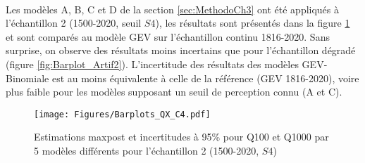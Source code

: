 \documentclass[11pt]{article}
\begin{document}
	\paragraph{} Les modèles A, B, C et D de la section \ref{sec:MethodoCh3} ont été appliqués à l'échantillon 2 (1500-2020, seuil $S4$), les résultats sont présentés dans la figure \ref{fig:BarplotC4} et sont comparés au modèle GEV sur l'échantillon continu 1816-2020. Sans surprise, on observe des résultats moins incertains que pour l'échantillon dégradé (figure \ref{fig:Barplot_Artif2}). L'incertitude des résultats des modèles GEV-Binomiale est au moins équivalente à celle de la référence (GEV 1816-2020), voire plus faible pour les modèles supposant un seuil de perception connu (A et C).

	\begin{figure}[h]
		\centering
		\texttt{[image: Figures/Barplots\_QX\_C4.pdf]}
		\caption{Estimations maxpost et incertitudes à 95\% pour Q100 et Q1000 par 5 modèles différents pour l'échantillon 2 (1500-2020, $S4$)}
		\label{fig:BarplotC4}
	\end{figure}
	
		\begin{table}[h]
	\centering
	\caption{Résultats maxpost et incertitudes des 5 modèles pour l'échantillon 2. Q100 et Q1000 représentent respectivement le débit des crues centennales et millénales, $\xi$ le paramètre de forme de la distribution GEV, $S$ le seuil de perception et $t^{*}$ la date de début de la période historique. Les écarts type des distributions a posteriori sont représentés par les colonnes débutant par la lettre "u".}
		\label{tab:ResC4}

	\end{table}
	
\end{document}

